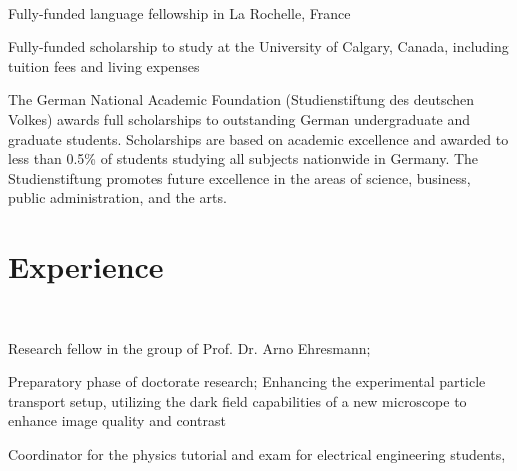 \begin{adjustwidth}{2.5cm}{1.9cm}
 \\
\begin{tightemize} \vspace{-3pt}
\item Fully-funded language fellowship in La Rochelle, France
\end{tightemize}
\begin{tightemize} \vspace{-3pt}
\item Fully-funded scholarship to study at the University of Calgary, Canada, including tuition fees and living expenses %
\end{tightemize}
\begin{tightemize} \vspace{-3pt}
\item The German National Academic Foundation (Studienstiftung des deutschen Volkes) awards full scholarships to outstanding German undergraduate and graduate students. Scholarships are based on academic excellence and awarded to less than 
0.5\hspace{0.7pt}\%
of students studying all subjects nationwide in Germany. The Studienstiftung promotes future excellence in the areas of science, business, public administration, and the arts.
\end{tightemize}

\section{Experience}
 \\
\begin{tightemize} \vspace{-3pt}
\item Research fellow in the group of Prof. Dr. Arno Ehresmann;

Preparatory phase of doctorate research; 
Enhancing the experimental particle transport setup, utilizing the dark field capabilities of a new microscope to enhance image quality and contrast
\end{tightemize}
\vspace{-9pt}
\begin{tightemize} \vspace{-3pt}
\item Coordinator for the physics tutorial and exam for electrical engineering students,


\end{tightemize}
\end{adjustwidth}
